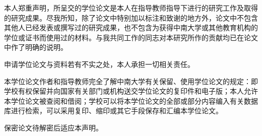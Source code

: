 
\parbox{\textwidth}{}


\vspace{1cm}
\noindent{}

\vspace{0.5cm}

{本人郑重声明，所呈交的学位论文是本人在指导教师指导下进行的研究工作及取得的研究成果。尽我所知，除了论文中特别加以标注和致谢的地方外，论文中不包含其他人已经发表或撰写过的研究成果，也不包含为获得中南大学或其他教育机构的学位或证书而使用过的材料。与我共同工作的同志对本研究所作的贡献均已在论文中作了明确的说明。

申请学位论文与资料若有不实之处，本人承担一切相关责任。}

\vspace{1cm}
\noindent\parbox{\textwidth}{
	}


\vspace{2cm}
\noindent{}

\vspace{0.5cm}

{本学位论文作者和指导教师完全了解中南大学有关保留、使用学位论文的规定：即学校有权保留并向国家有关部门或机构送交学位论文的复印件和电子版；本人允许本学位论文被查阅和借阅；学校可以将本学位论文的全部或部分内容编入有关数据库进行检索，可以采用复印、缩印或其它手段保存和汇编本学位论文。
	
	保密论文待解密后适应本声明。}

\vspace{1cm}
\noindent\parbox{\textwidth}{
	
}
\newpage